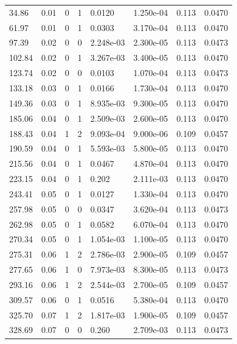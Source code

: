 \documentclass[preview]{standalone}
\begin{document}
{{\begin{tabular}{L{1.2cm}C{1.2cm} C{0.3cm}C{0.5cm} C{1.4cm}C{1.4cm} C{1.4cm}C{1.4cm}}
  34.86  &  0.01  & 0     &  1 &  0.0120  & 1.250e-04  & 0.113 &  0.0470   \\ 
  61.97  &  0.01  & 0     &  1 &  0.0303  & 3.170e-04  & 0.113 &  0.0470   \\ 
  97.39  &  0.02  & 0     &  0 &  2.248e-03  & 2.300e-05  & 0.113 &  0.0473   \\ 
  102.84  &  0.02  & 0     &  1 &  3.267e-03  & 3.400e-05  & 0.113 &  0.0470   \\ 
  123.74  &  0.02  & 0     &  0 &  0.0103  & 1.070e-04  & 0.113 &  0.0473   \\ 
  133.18  &  0.03  & 0     &  1 &  0.0166  & 1.730e-04  & 0.113 &  0.0470   \\ 
  149.36  &  0.03  & 0     &  1 &  8.935e-03  & 9.300e-05  & 0.113 &  0.0470   \\ 
  185.06  &  0.04  & 0     &  1 &  2.509e-03  & 2.600e-05  & 0.113 &  0.0470   \\ 
  188.43  &  0.04  & 1     &  2 &  9.093e-04  & 9.000e-06  & 0.109 &  0.0457   \\ 
  190.59  &  0.04  & 0     &  1 &  5.593e-03  & 5.800e-05  & 0.113 &  0.0470   \\ 
  215.56  &  0.04  & 0     &  1 &  0.0467  & 4.870e-04  & 0.113 &  0.0470   \\ 
  223.15  &  0.04  & 0     &  1 &  0.202  & 2.111e-03  & 0.113 &  0.0470   \\ 
  243.41  &  0.05  & 0     &  1 &  0.0127  & 1.330e-04  & 0.113 &  0.0470   \\ 
  257.98  &  0.05  & 0     &  0 &  0.0347  & 3.620e-04  & 0.113 &  0.0473   \\ 
  262.98  &  0.05  & 0     &  1 &  0.0582  & 6.070e-04  & 0.113 &  0.0470   \\ 
  270.34  &  0.05  & 0     &  1 &  1.054e-03  & 1.100e-05  & 0.113 &  0.0470   \\ 
  275.31  &  0.06  & 1     &  2 &  2.786e-03  & 2.900e-05  & 0.109 &  0.0457   \\ 
  277.65  &  0.06  & 1     &  0 &  7.973e-03  & 8.300e-05  & 0.113 &  0.0473   \\ 
  293.16  &  0.06  & 1     &  2 &  2.544e-03  & 2.700e-05  & 0.109 &  0.0457   \\ 
  309.57  &  0.06  & 0     &  1 &  0.0516  & 5.380e-04  & 0.113 &  0.0470   \\ 
  325.70  &  0.07  & 1     &  2 &  1.817e-03  & 1.900e-05  & 0.109 &  0.0457   \\ 
  328.69  &  0.07  & 0     &  0 &  0.260  & 2.709e-03  & 0.113 &  0.0473   \\ 

\end{tabular}}}
\end{document}
